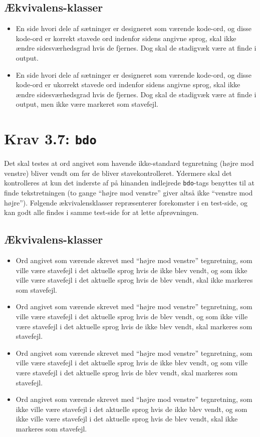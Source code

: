 \documentclass[a4paper,oneside,article, titlepage]{memoir}
\begin{document}
\subsection{Ækvivalens-klasser}
\begin{itemize}
\item En side hvori dele af sætninger er designeret som værende
  kode-ord, og disse kode-ord er korrekt stavede ord indenfor sidens
  angivne sprog, skal ikke ændre sidesværhedsgrad hvis de fjernes. Dog
  skal de stadigvæk være at finde i output.
\item En side hvori dele af sætninger er designeret som værende
  kode-ord, og disse kode-ord er ukorrekt stavede ord indenfor sidens
  angivne sprog, skal ikke ændre sidesværhedsgrad hvis de fjernes. Dog
  skal de stadigvæk være at finde i output, men ikke være markeret som
  stavefejl.
\end{itemize}

\section*{Krav 3.7: \texttt{bdo}}

Det skal testes at ord angivet som havende ikke-standard tegnretning
(højre mod venstre) bliver vendt om før de bliver
stavekontrolleret. Ydermere skal det kontrolleres at kun det inderste
af på hinanden indlejrede \texttt{bdo}-tags benyttes til at finde
tekstretningen (to gange ``højre mod venstre'' giver altså ikke
``venstre mod højre''). Følgende ækvivalensklasser repræsenterer
forekomster i en test-side, og kan godt alle findes i samme test-side
for at lette afprøvningen.

\subsection{Ækvivalens-klasser}
\begin{itemize}
\item Ord angivet som værende skrevet med ``højre mod venstre''
  tegnretning, som ville være stavefejl i det aktuelle sprog hvis de
  ikke blev vendt, og som ikke ville være stavefejl i det aktuelle
  sprog hvis de blev vendt, skal ikke markeres som stavefejl.
\item Ord angivet som værende skrevet med ``højre mod venstre''
  tegnretning, som ville være stavefejl i det aktuelle sprog hvis de
  blev vendt, og som ikke ville være stavefejl i det aktuelle sprog
  hvis de ikke blev vendt, skal markeres som stavefejl.
\item Ord angivet som værende skrevet med ``højre mod venstre''
  tegnretning, som ville være stavefejl i det aktuelle sprog hvis de
  ikke blev vendt, og som ville være stavefejl i det aktuelle sprog
  hvis de blev vendt, skal markeres som stavefejl.
\item Ord angivet som værende skrevet med ``højre mod venstre''
  tegnretning, som ikke ville være stavefejl i det aktuelle sprog hvis
  de ikke blev vendt, og som ikke ville være stavefejl i det aktuelle
  sprog hvis de blev vendt, skal ikke markeres som stavefejl.
\end{itemize}
\end{document}
